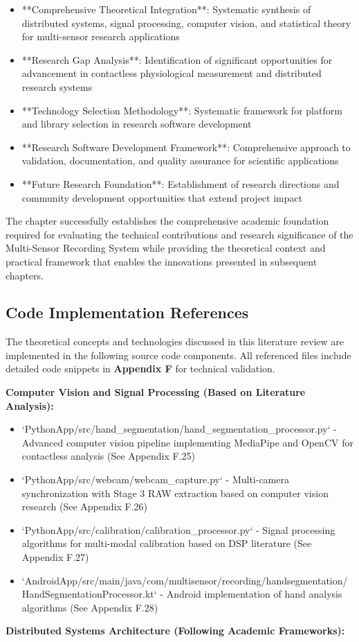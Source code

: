 \documentclass[12pt,a4paper]{report}
\begin{document}
\begin{itemize}
\item **Comprehensive Theoretical Integration**: Systematic synthesis of distributed systems, signal processing, computer
  vision, and statistical theory for multi-sensor research applications
\item **Research Gap Analysis**: Identification of significant opportunities for advancement in contactless physiological
  measurement and distributed research systems
\item **Technology Selection Methodology**: Systematic framework for platform and library selection in research software
  development
\item **Research Software Development Framework**: Comprehensive approach to validation, documentation, and quality
  assurance for scientific applications
\item **Future Research Foundation**: Establishment of research directions and community development opportunities that
  extend project impact

\end{itemize}
The chapter successfully establishes the comprehensive academic foundation required for evaluating the technical
contributions and research significance of the Multi-Sensor Recording System while providing the theoretical context and
practical framework that enables the innovations presented in subsequent chapters.

\subsection{Code Implementation References}

The theoretical concepts and technologies discussed in this literature review are implemented in the following source
code components. All referenced files include detailed code snippets in \textbf{Appendix F} for technical validation.

\textbf{Computer Vision and Signal Processing (Based on Literature Analysis):}

\begin{itemize}
\item `PythonApp/src/hand_segmentation/hand_segmentation_processor.py` - Advanced computer vision pipeline implementing
  MediaPipe and OpenCV for contactless analysis (See Appendix F.25)
\item `PythonApp/src/webcam/webcam_capture.py` - Multi-camera synchronization with Stage 3 RAW extraction based on computer
  vision research (See Appendix F.26)
\item `PythonApp/src/calibration/calibration_processor.py` - Signal processing algorithms for multi-modal calibration based
  on DSP literature (See Appendix F.27)
\item `AndroidApp/src/main/java/com/multisensor/recording/handsegmentation/HandSegmentationProcessor.kt` - Android
  implementation of hand analysis algorithms (See Appendix F.28)

\end{itemize}
\textbf{Distributed Systems Architecture (Following Academic Frameworks):}
\end{document}
